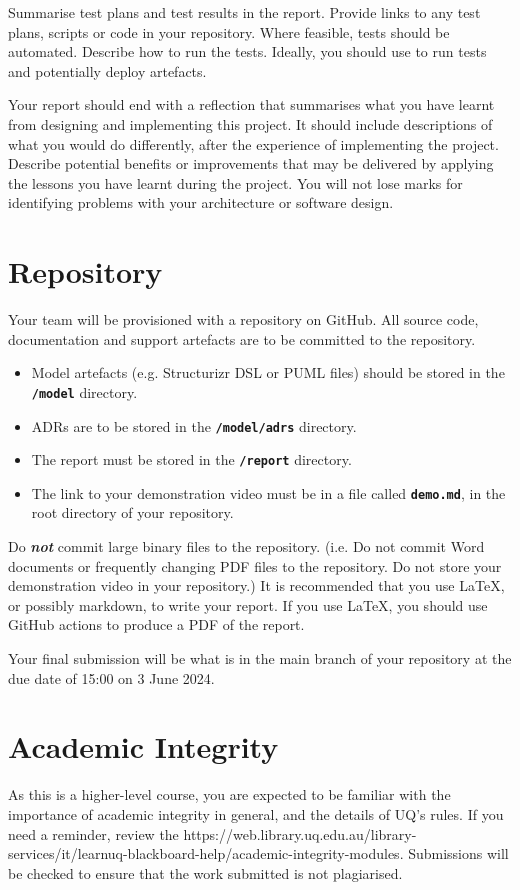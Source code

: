 \documentclass{csse4400}
\begin{document}
Summarise test plans and test results in the report.
Provide links to any test plans, scripts or code in your repository.
Where feasible, tests should be automated.
Describe how to run the tests.
Ideally, you should use 
to run tests and potentially deploy artefacts.

Your report should end with a reflection that summarises what you have learnt from designing and implementing this project.
It should include descriptions of what you would do differently, after the experience of implementing the project.
Describe potential benefits or improvements that may be delivered by applying the lessons you have learnt during the project.
You will not lose marks for identifying problems with your architecture or software design.


\section{Repository}
Your team will be provisioned with a repository on GitHub.
All source code, documentation and support artefacts are to be committed to the repository.

\begin{itemize}[itemsep=3pt,parsep=3pt]
    \item Model artefacts (e.g. Structurizr DSL or PUML files) should be stored in the \textbf{\texttt{/model}} directory.
    \item ADRs are to be stored in the \textbf{\texttt{/model/adrs}} directory.
    \item The report must be stored in the \textbf{\texttt{/report}} directory.
    \item The link to your demonstration video must be in a file called \textbf{\texttt{demo.md}}, in the root directory of your repository.
\end{itemize}

Do \textbf{\emph{not}} commit large binary files to the repository.
(i.e. Do not commit Word documents or frequently changing PDF files to the repository.
Do not store your demonstration video in your repository.)
It is recommended that you use LaTeX, or possibly markdown, to write your report.
If you use LaTeX, you should use GitHub actions to produce a PDF of the report.

Your final submission will be what is in the main branch of your repository at the due date of 15:00 on 3 June 2024.


\section{Academic Integrity}
As this is a higher-level course, you are expected to be familiar with the importance of academic integrity in general, and the details of UQ's rules.
If you need a reminder, review the 
{https://web.library.uq.edu.au/library-services/it/learnuq-blackboard-help/academic-integrity-modules}.
Submissions will be checked to ensure that the work submitted is not plagiarised.
\end{document}
